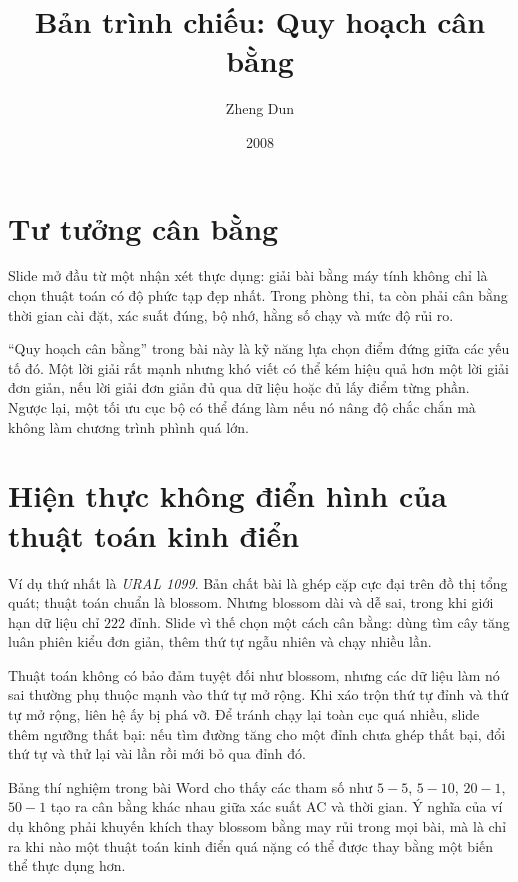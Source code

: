 \documentclass[11pt]{article}
\title{Bản trình chiếu: Quy hoạch cân bằng}
\author{Zheng Dun}
\date{2008}
\begin{document}
\maketitle


\section{Tư tưởng cân bằng}

Slide mở đầu từ một nhận xét thực dụng: giải bài bằng máy tính không chỉ là
chọn thuật toán có độ phức tạp đẹp nhất. Trong phòng thi, ta còn phải cân bằng
thời gian cài đặt, xác suất đúng, bộ nhớ, hằng số chạy và mức độ rủi ro.

``Quy hoạch cân bằng'' trong bài này là kỹ năng lựa chọn điểm đứng giữa các
yếu tố đó. Một lời giải rất mạnh nhưng khó viết có thể kém hiệu quả hơn một
lời giải đơn giản, nếu lời giải đơn giản đủ qua dữ liệu hoặc đủ lấy điểm từng
phần. Ngược lại, một tối ưu cục bộ có thể đáng làm nếu nó nâng độ chắc chắn mà
không làm chương trình phình quá lớn.

\section{Hiện thực không điển hình của thuật toán kinh điển}

Ví dụ thứ nhất là \textit{URAL 1099}. Bản chất bài là ghép cặp cực đại trên
đồ thị tổng quát; thuật toán chuẩn là blossom. Nhưng blossom dài và dễ sai,
trong khi giới hạn dữ liệu chỉ \(222\) đỉnh. Slide vì thế chọn một cách cân
bằng: dùng tìm cây tăng luân phiên kiểu đơn giản, thêm thứ tự ngẫu nhiên và
chạy nhiều lần.

Thuật toán không có bảo đảm tuyệt đối như blossom, nhưng các dữ liệu làm nó
sai thường phụ thuộc mạnh vào thứ tự mở rộng. Khi xáo trộn thứ tự đỉnh và thứ
tự mở rộng, liên hệ ấy bị phá vỡ. Để tránh chạy lại toàn cục quá nhiều, slide
thêm ngưỡng thất bại: nếu tìm đường tăng cho một đỉnh chưa ghép thất bại, đổi
thứ tự và thử lại vài lần rồi mới bỏ qua đỉnh đó.

Bảng thí nghiệm trong bài Word cho thấy các tham số như \(5-5\), \(5-10\),
\(20-1\), \(50-1\) tạo ra cân bằng khác nhau giữa xác suất AC và thời gian.
Ý nghĩa của ví dụ không phải khuyến khích thay blossom bằng may rủi trong mọi
bài, mà là chỉ ra khi nào một thuật toán kinh điển quá nặng có thể được thay
bằng một biến thể thực dụng hơn.
\end{document}
